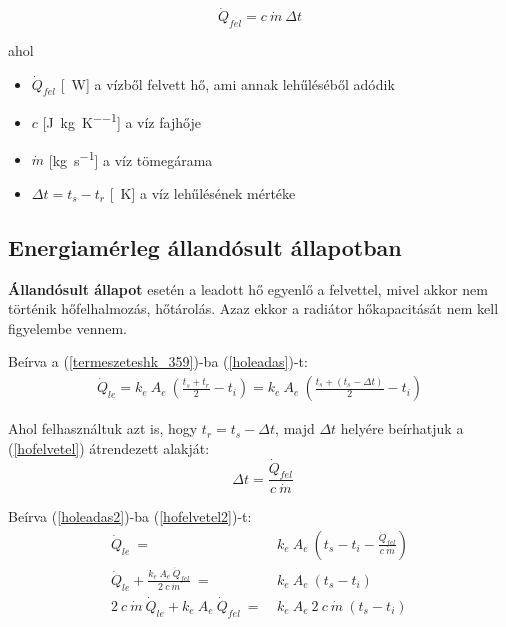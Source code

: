 \begin{equation} \label{hofelvetel}
\dot Q_{fel} = c ~ \dot{m} ~ \Delta t
\end{equation}

ahol

\begin{itemize}[itemsep=6pt,topsep=0pt,parsep=0pt,partopsep=0pt]
	\item[] $\dot{Q}_{fel}$ [\SI{}{\watt}] a vízből felvett hő, ami annak lehűléséből adódik
	\item[] $c$ [\si[per-mode = fraction]{\joule\per\kg\per\kelvin}] a víz fajhője
	\item[] $\dot{m}$ [\si[per-mode = fraction]{\kg\per\second}] a víz tömegárama
	\item[] $\Delta t = t_s-t_r$ [\SI{}{\kelvin}] a víz lehűlésének mértéke
\end{itemize}

\subsection{Energiamérleg állandósult állapotban}
\textbf{Állandósult állapot} esetén a leadott hő egyenlő a felvettel, mivel akkor nem történik hőfelhalmozás, hőtárolás.
Azaz ekkor a radiátor hőkapacitását nem kell figyelembe vennem.

Beírva a (\ref{termeszeteshk_359})-ba (\ref{holeadas})-t:
\begin{equation} \label{holeadas2}
\begin{aligned}
\dot Q_{le} = k_e ~ A_e ~ \left( \frac{t_s+t_r}{2}-t_i\right) = k_e ~ A_e ~ \left( \frac{t_s+(t_s-\Delta t)}{2}-t_i\right)
\end{aligned}
\end{equation}

Ahol felhasználtuk azt is, hogy $t_r = t_s-\Delta t$, majd $\Delta t$ helyére beírhatjuk a (\ref{hofelvetel})  átrendezett alakját:
\begin{equation} \label{hofelvetel2}
~~\Delta t = \frac{\dot Q_{fel}}{c ~ \dot{m}}
\end{equation}

Beírva (\ref{holeadas2})-ba (\ref{hofelvetel2})-t:
\begin{equation} \label{holeadas3}
\begin{aligned}
\dot Q_{le} ~=~ & k_e ~ A_e ~ \left( t_s-t_i-\frac{\dot Q_{fel}}{c ~ \dot{m}}\right)  \\[18pt]
\dot Q_{le} + \frac{k_e ~ A_e ~ \dot Q_{fel}}{2 ~ c ~ \dot{m}} ~ = ~ & k_e ~ A_e ~(t_s-t_i) \\[24pt]
2 ~ c ~ \dot{m} ~ \dot Q_{le} + k_e ~ A_e ~ \dot Q_{fel} ~ = ~ &  k_e ~ A_e ~ 2~ c~ \dot{m} ~(t_s-t_i)
\end{aligned}
\end{equation}

